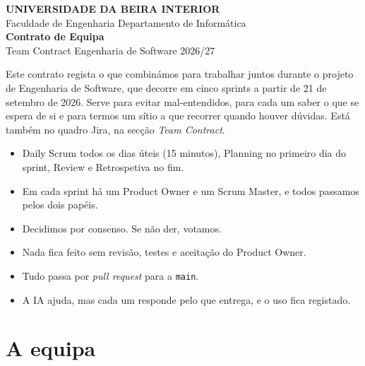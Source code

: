 \documentclass[11pt,a4paper]{article}
\begin{document}
\thispagestyle{primeira}

\begin{tcolorbox}[colback=azul, colframe=azul, coltext=white, arc=3pt, boxrule=0pt,
    left=16pt, right=16pt, top=14pt, bottom=14pt]
  \sffamily
  {\footnotesize\bfseries\MakeUppercase{Universidade da Beira Interior}}\\[2pt]
  {\footnotesize Faculdade de Engenharia \textperiodcentered{} Departamento de Informática}\\[16pt]
  {\fontsize{28}{32}\selectfont\bfseries Contrato de Equipa}\\[4pt]
  {\large Team Contract \textperiodcentered{} Engenharia de Software 2026/27}
\end{tcolorbox}

Este contrato regista o que combinámos para trabalhar juntos durante o projeto de Engenharia de Software, que decorre em cinco sprints a partir de 21 de setembro de 2026. Serve para evitar mal-entendidos, para cada um saber o que se espera de si e para termos um sítio a que recorrer quando houver dúvidas. Está também no quadro Jira, na secção \textit{Team Contract}.

\begin{tcolorbox}[caixa, title={Em resumo}, colback=azulclaro!60]
  \begin{itemize}
    \item Daily Scrum todos os dias úteis (15 minutos), Planning no primeiro dia do sprint, Review e Retrospetiva no fim.
    \item Em cada sprint há um Product Owner e um Scrum Master, e todos passamos pelos dois papéis.
    \item Decidimos por consenso. Se não der, votamos.
    \item Nada fica feito sem revisão, testes e aceitação do Product Owner.
    \item Tudo passa por \textit{pull request} para a \texttt{main}.
    \item A IA ajuda, mas cada um responde pelo que entrega, e o uso fica registado.
  \end{itemize}
\end{tcolorbox}

\section*{A equipa}
\end{document}
